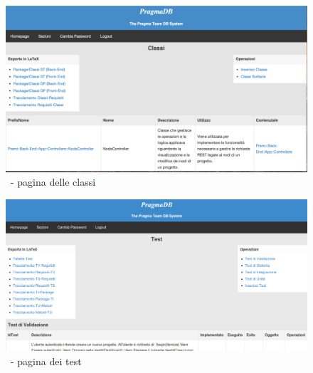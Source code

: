 \begin{figure}[h]
\centering
\includegraphics[width=\textwidth,keepaspectratio]{../immagini/pragmadbClassi.png}
\caption{\pragmadb\ - pagina delle classi}\label{fig: PDBGlossario}
\end{figure}
\begin{figure}[h]
\centering
\includegraphics[width=\textwidth,keepaspectratio]{../immagini/pragmadbTest.png}
\caption{\pragmadb\ - pagina dei test}\label{fig: PDBTest}
\end{figure}
